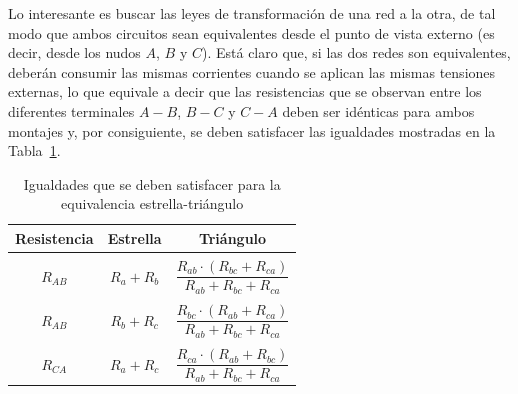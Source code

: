 	Lo interesante es buscar las leyes de transformación de una red a la otra, de tal modo que ambos circuitos sean equivalentes desde el punto de vista externo (es decir,
	desde los nudos $A$, $B$ y $C$). Está claro que, si las dos redes son equivalentes, deberán consumir las mismas
	corrientes cuando se aplican las mismas tensiones externas, lo que equivale a decir que las resistencias que se observan entre los diferentes terminales $A-B$, $B-C$ y $C-A$ deben ser idénticas para ambos montajes y, por consiguiente, se
	deben satisfacer las igualdades mostradas en la Tabla~\ref{tab.igualdades_estrellatriangulo}. 
	\begin{table}[H]
		\centering
		\begin{tabular}{c|c|c} \textbf{Resistencia} & \textbf{Estrella} & \textbf{Triángulo}\\\hline
			&&        \\[-0.75em]
			$R_{AB}$ & $R_a+R_b$ & $\dfrac{R_{ab} \cdot (R_{bc} + R_{ca})}{R_{ab} + R_{bc} + R_{ca}}$\\
			&&         \\[-0.75em]
			$R_{AB}$ & $R_b+R_c$ & $\dfrac{R_{bc} \cdot (R_{ab} + R_{ca})}{R_{ab} + R_{bc} + R_{ca}}$\\
			&& \\[-0.75em]
			$R_{CA}$ & $R_a+R_c$ & $\dfrac{R_{ca} \cdot (R_{ab} + R_{bc})}{R_{ab} + R_{bc} + R_{ca}}$\\
		\end{tabular}
		\caption{Igualdades que se deben satisfacer para la equivalencia estrella-triángulo}
		\label{tab.igualdades_estrellatriangulo}
	\end{table}
	
